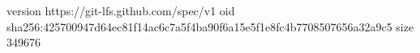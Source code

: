 version https://git-lfs.github.com/spec/v1
oid sha256:425700947d64ec81f14ac6c7a5f4ba90f6a15e5f1e8fc4b7708507656a32a9c5
size 349676
